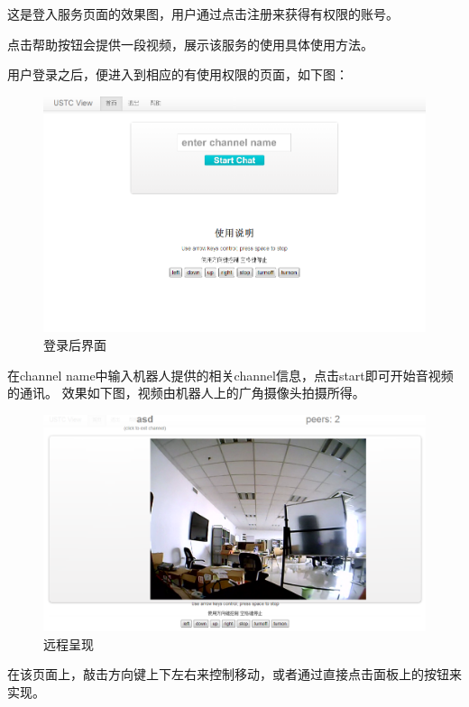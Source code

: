 这是登入服务页面的效果图，用户通过点击注册来获得有权限的账号。

点击帮助按钮会提供一段视频，展示该服务的使用具体使用方法。

用户登录之后，便进入到相应的有使用权限的页面，如下图：

\begin{figure}[h]
        \centering
                \includegraphics[width=.70\textwidth]{Figures/ch9.user.png}
        \caption{登录后界面}
        \label{fig:user}
\end{figure}

在channel name中输入机器人提供的相关channel信息，点击start即可开始音视频的通讯。
效果如下图，视频由机器人上的广角摄像头拍摄所得。

\begin{figure}[h]
        \centering
                \includegraphics[width=.70\textwidth]{Figures/ch9.view.png}
        \caption{远程呈现}
        \label{fig:view}
\end{figure}

在该页面上，敲击方向键上下左右来控制移动，或者通过直接点击面板上的按钮来实现。

